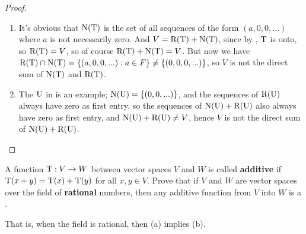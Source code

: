 \begin{proof} \ 
\begin{enumerate}
\item It's obvious that \(\mathrm{N(T)}\) is the set of all sequences of the form \((a, 0, 0, ...)\) where \(a\) is not necessarily zero.
And \(V = \mathrm{R(T)} + \mathrm{N(T)}\), since by \EXEC{2.1.21}, \(\mathrm{T}\) is onto, so \(\mathrm{R(T)} = V\), so of course \(\mathrm{R(T)} + \mathrm{N(T)} = V\).
But now we have \(\mathrm{R(T)} \cap \mathrm{N(T)} = \{ (a, 0, 0, ...) : a \in F \} \ne \{ (0, 0, 0, ...) \}\),
so \(V\) is not the direct sum of \(\mathrm{N(T)}\) and \(\mathrm{R(T)}\).

\item The \(\mathrm{U}\) in  is an example;
    \(\mathrm{N}(\mathrm{U}) = \{ (0, 0, ...) \}\), and the sequences of \(\mathrm{R}(\mathrm{U})\) always have zero as first entry,
    so the sequences of \(\mathrm{N}(\mathrm{U}) + \mathrm{R}(\mathrm{U})\) also always have zero as first entry, and \(\mathrm{N}(\mathrm{U}) + \mathrm{R}(\mathrm{U}) \ne V\),
    hence \(V\) is not the direct sum of \(\mathrm{N}(\mathrm{U}) + \mathrm{R}(\mathrm{U})\).
\end{enumerate}
\end{proof}

\begin{exercise} \label{exercise 2.1.38}
A function \(\mathrm{T}: V \to W\) between vector spaces \(V\) and \(W\) is called \textbf{additive} if \(\mathrm{T}(x + y) = \mathrm{T}(x) + \mathrm{T}(y)\) for all \(x, y \in V\).
Prove that if \(V\) and \(W\) are vector spaces over the field of \textbf{rational} numbers, then any additive
function from \(V\) into \(W\) is a \LTRAN{}.

That is, when the field is rational, then (a) implies (b).
\end{exercise}

